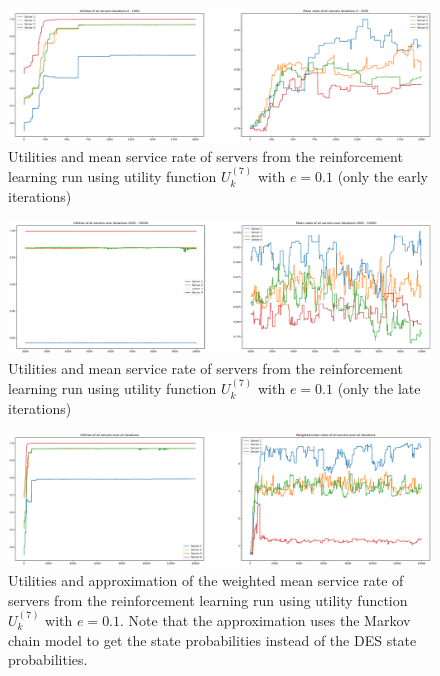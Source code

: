 \begin{figure}[H]
    \includegraphics[width=\textwidth]{chapters/00_appendix/03_more_rl_results/Bin/utility_7_eps/u7_2_e01_early_iter.eps}
    \caption{Utilities and mean service rate of servers from the reinforcement
    learning run using utility function \(U_k^{(7)}\) with \(e = 0.1\) (only
    the early iterations)}
    \label{fig:RL_utility7_2_e01_early_iter}
\end{figure}


\begin{figure}[H]
    \includegraphics[width=\textwidth]{chapters/00_appendix/03_more_rl_results/Bin/utility_7_eps/u7_2_e01_late_iter.eps}
    \caption{Utilities and mean service rate of servers from the reinforcement
    learning run using utility function \(U_k^{(7)}\) with \(e = 0.1\) (only
    the late iterations)}
    \label{fig:RL_utility7_2_e01_late_iter}
\end{figure}


\begin{figure}[H]
    \includegraphics[width=\textwidth]{chapters/00_appendix/03_more_rl_results/Bin/utility_7_eps/u7_3_e01_markov.eps}
    \caption{Utilities and approximation of the weighted mean service rate of
    servers from the reinforcement learning run using utility function
    \(U_k^{(7)}\) with \(e = 0.1\). Note that the approximation uses the Markov
    chain model to get the state probabilities instead of the DES state
    probabilities.}
    \label{fig:RL_utility7_3_e01_markov}
\end{figure}


